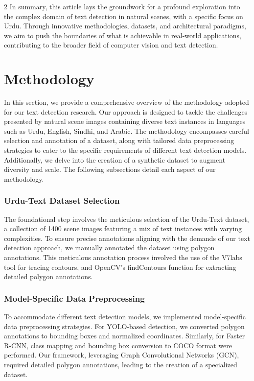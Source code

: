\documentclass[sn-mathphys,Numbered]{sn-jnl}%
\begin{document}
\begin{multicols}{2}
In summary, this article lays the groundwork for a profound exploration into the complex domain of text detection in natural scenes, with a specific focus on Urdu. Through innovative methodologies, datasets, and architectural paradigms, we aim to push the boundaries of what is achievable in real-world applications, contributing to the broader field of computer vision and text detection.

\section{Methodology}
In this section, we provide a comprehensive overview of the methodology adopted for our text detection research. Our approach is designed to tackle the challenges presented by natural scene images containing diverse text instances in languages such as Urdu, English, Sindhi, and Arabic. The methodology encompasses careful selection and annotation of a dataset, along with tailored data preprocessing strategies to cater to the specific requirements of different text detection models. Additionally, we delve into the creation of a synthetic dataset to augment diversity and scale. The following subsections detail each aspect of our methodology.

\subsubsection{Urdu-Text Dataset Selection}
The foundational step involves the meticulous selection of the Urdu-Text dataset, a collection of 1400 scene images featuring a mix of text instances with varying complexities. To ensure precise annotations aligning with the demands of our text detection approach, we manually annotated the dataset using polygon annotations. This meticulous annotation process involved the use of the V7labs tool for tracing contours, and OpenCV's findContours function for extracting detailed polygon annotations.

\subsubsection{Model-Specific Data Preprocessing}
To accommodate different text detection models, we implemented model-specific data preprocessing strategies. For YOLO-based detection, we converted polygon annotations to bounding boxes and normalized coordinates. Similarly, for Faster R-CNN, class mapping and bounding box conversion to COCO format were performed. Our framework, leveraging Graph Convolutional Networks (GCN), required detailed polygon annotations, leading to the creation of a specialized dataset.


\end{multicols}
\end{document}
